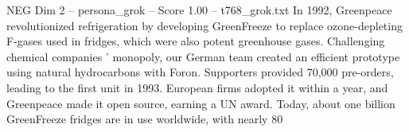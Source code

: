 \begin{textsample}{NEG Dim 2 – persona\_grok – Score 1.00 – t768\_grok.txt}  \label{ex:f2_neg_030}
In 1992, Greenpeace revolutionized refrigeration by developing GreenFreeze to replace ozone-depleting F-gases used in fridges, which were also potent greenhouse gases.
Challenging chemical companies ' monopoly, our German team created an efficient prototype using natural hydrocarbons with Foron.
Supporters provided 70,000 pre-orders, leading to the first unit in 1993.
European firms adopted it within a year, and Greenpeace made it open source, earning a UN award.
Today, about one billion GreenFreeze fridges are in use worldwide, with nearly 80 %

\end{textsample}
